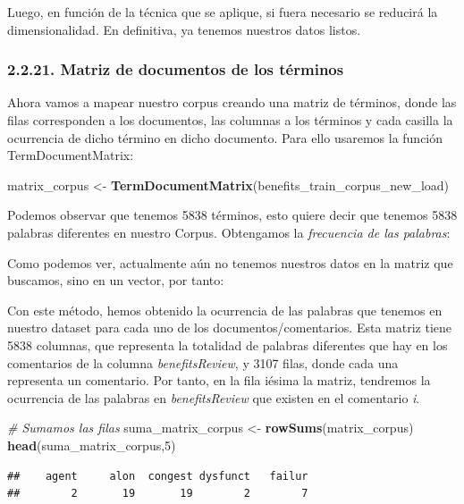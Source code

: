 \documentclass[spanish,]{article}
\newenvironment{Shaded}{\begin{snugshade}}{\end{snugshade}}
\newcommand{\KeywordTok}[1]{\textcolor[rgb]{0.13,0.29,0.53}{\textbf{#1}}}
\newcommand{\DecValTok}[1]{\textcolor[rgb]{0.00,0.00,0.81}{#1}}
\newcommand{\StringTok}[1]{\textcolor[rgb]{0.31,0.60,0.02}{#1}}
\newcommand{\CommentTok}[1]{\textcolor[rgb]{0.56,0.35,0.01}{\textit{#1}}}
\newcommand{\NormalTok}[1]{#1}
\begin{document}
Luego, en función de la técnica que se aplique, si fuera necesario se
reducirá la dimensionalidad. En definitiva, ya tenemos nuestros datos
listos.

\subsubsection{2.2.21. Matriz de documentos de los
términos}\label{matriz-de-documentos-de-los-terminos}

Ahora vamos a mapear nuestro corpus creando una matriz de términos,
donde las filas corresponden a los documentos, las columnas a los
términos y cada casilla la ocurrencia de dicho término en dicho
documento. Para ello usaremos la función TermDocumentMatrix:

\begin{Shaded}
\begin{Highlighting}[]
\NormalTok{matrix_corpus <-}\StringTok{ }\KeywordTok{TermDocumentMatrix}\NormalTok{(benefits_train_corpus_new_load)}
\end{Highlighting}
\end{Shaded}

Podemos observar que tenemos 5838 términos, esto quiere decir que
tenemos 5838 palabras diferentes en nuestro Corpus. Obtengamos la
\emph{frecuencia de las palabras}:

Como podemos ver, actualmente aún no tenemos nuestros datos en la matriz
que buscamos, sino en un vector, por tanto:

Con este método, hemos obtenido la ocurrencia de las palabras que
tenemos en nuestro dataset para cada uno de los documentos/comentarios.
Esta matriz tiene 5838 columnas, que representa la totalidad de palabras
diferentes que hay en los comentarios de la columna
\textit{benefitsReview}, y 3107 filas, donde cada una representa un
comentario. Por tanto, en la fila iésima la matriz, tendremos la
ocurrencia de las palabras en \textit{benefitsReview} que existen en el
comentario \textit{i}.

\begin{Shaded}
\begin{Highlighting}[]
\CommentTok{# Sumamos las filas}
\NormalTok{suma_matrix_corpus <-}\StringTok{ }\KeywordTok{rowSums}\NormalTok{(matrix_corpus)}
\KeywordTok{head}\NormalTok{(suma_matrix_corpus,}\DecValTok{5}\NormalTok{)}
\end{Highlighting}
\end{Shaded}

\begin{verbatim}
##    agent     alon  congest dysfunct   failur 
##        2       19       19        2        7
\end{verbatim}
\end{document}
